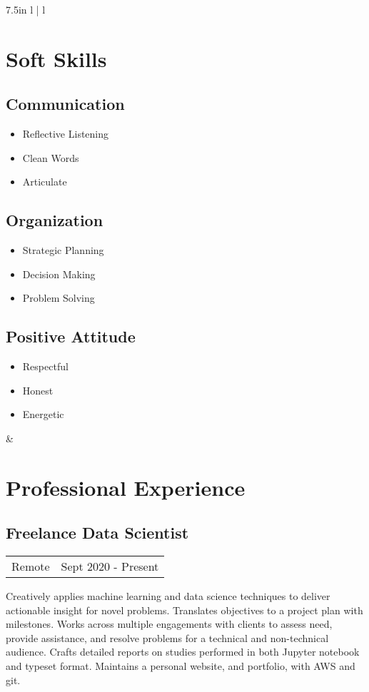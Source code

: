 \documentclass{article}
\begin{document}
\begin{tabular*}{7.5in}{ l | l}
\begin{minipage}[t]{2.0in}
	\section*{Soft Skills}
	\subsection*{Communication}
	\begin{itemize}[noitemsep]
		\item Reflective Listening
		\item Clean Words
		\item Articulate
	\end{itemize}
	\subsection*{Organization}
	\begin{itemize}[noitemsep]
		\item Strategic Planning
		\item Decision Making
		\item Problem Solving
	\end{itemize}
	\subsection*{Positive Attitude}
	\begin{itemize}[noitemsep]
		\item Respectful
		\item Honest
		\item Energetic
	\end{itemize}
	\smallskip
	\end{minipage} &
	
	\begin{minipage}[t]{5.25in}
	\section*{Professional Experience}
	\subsection*{Freelance Data Scientist}
	\begin{tabular*}{\columnwidth}{@{\extracolsep{\fill}}lr}
	Remote & Sept 2020 - Present
	\end{tabular*}
	Creatively applies machine learning and data science techniques to deliver actionable insight for novel problems.
	Translates objectives to a project plan with milestones.
	Works across multiple engagements with clients to assess need, provide assistance, and resolve problems for a technical and non-technical audience.
	Crafts detailed reports on studies performed in both Jupyter notebook and typeset format.
	Maintains a personal website, and portfolio, with AWS and git.
	\medskip

\end{minipage}
\end{tabular*}
\end{document}

